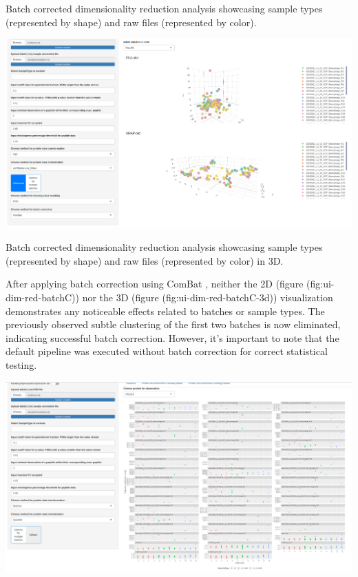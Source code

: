 \documentclass[
  11pt,
]{article}
\let\origfigure\figure
\begin{document}
\caption{Batch corrected dimensionality reduction analysis showcasing sample types (represented by shape) and raw files (represented by color).}\label{fig:ui-dim-red-batchC}
 \endfigure\egroup

\bgroup  \origfigure[H] 

{\centering \includegraphics[width=1\linewidth]{screenshots/dim_red_batchC_3d} 

}

\caption{Batch corrected dimensionality reduction analysis showcasing sample types (represented by shape) and raw files (represented by color) in 3D.}\label{fig:ui-dim-red-batchC-3d}
 \endfigure\egroup

After applying batch correction using ComBat \citep{Leek2012}, neither the 2D (figure (fig:ui-dim-red-batchC)) nor the 3D (figure (fig:ui-dim-red-batchC-3d)) visualization demonstrates any noticeable effects related to batches or sample types. The previously observed subtle clustering of the first two batches is now eliminated, indicating successful batch correction. However, it's important to note that the default pipeline was executed without batch correction for correct statistical testing.

\newpage
\bgroup  \origfigure[H] 

{\centering \includegraphics[width=1\linewidth]{screenshots/feature} 

}
\end{document}
